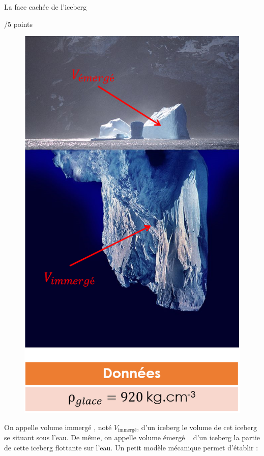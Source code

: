 \newpage
\begin{doc}{La face cachée de l'iceberg  \begin{Large}
    /5 points
\end{Large}}
\begin{figure}
\vspace{-1cm}
    \centering
      \includegraphics[scale=0.5]{Images/DS/DS1/Iceberg.png}
  \end{figure}
On appelle \og volume immergé \fg, noté $V_{\text{immergé}}$, d'un iceberg le volume de cet iceberg se situant sous l'eau. De même, on appelle \og volume émergé \fg~ d'un iceberg la partie de cette iceberg flottante sur l'eau. Un petit modèle mécanique permet d'établir :

\end{doc}
